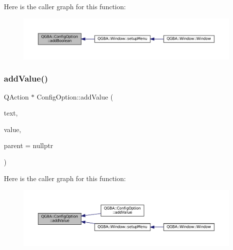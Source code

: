 Here is the caller graph for this function\+:
\nopagebreak
\begin{figure}[H]
\begin{center}
\leavevmode
\includegraphics[width=350pt]{class_q_g_b_a_1_1_config_option_a98b612a797cd568294af1a19913297af_icgraph}
\end{center}
\end{figure}
\mbox{\label{class_q_g_b_a_1_1_config_option_a037c85ff3f90cad9bfd8488d92d591d6}} 
\subsubsection{\texorpdfstring{add\+Value()}{addValue()}\hspace{0.1cm}{\footnotesize\ttfamily [1/2]}}
{\footnotesize\ttfamily Q\+Action $\ast$ Config\+Option\+::add\+Value (\begin{DoxyParamCaption}\item[{const Q\+String \&}]{text,  }\item[{const Q\+Variant \&}]{value,  }\item[{Q\+Menu $\ast$}]{parent = {\ttfamily nullptr} }\end{DoxyParamCaption})}

Here is the caller graph for this function\+:
\nopagebreak
\begin{figure}[H]
\begin{center}
\leavevmode
\includegraphics[width=350pt]{class_q_g_b_a_1_1_config_option_a037c85ff3f90cad9bfd8488d92d591d6_icgraph}
\end{center}
\end{figure}
\mbox{\label{class_q_g_b_a_1_1_config_option_aa932ea9aff61b5a1d2800bbe6c94f8ed}} 
